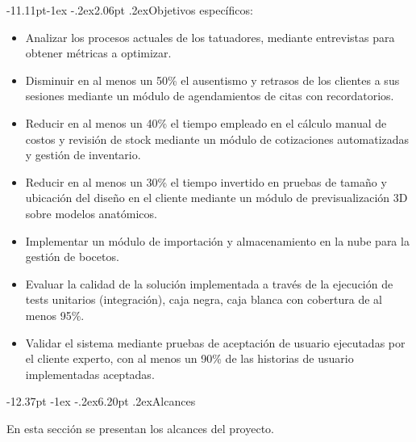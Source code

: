 \documentclass[12pt,letterpaper,oneside]{report}
\makeatletter
\renewcommand\section{\@startsection{section}{1}{\z@}%
  {-12.37pt \@plus -1ex \@minus -.2ex}{6.20pt \@plus.2ex}{\normalfont\large\bfseries}}
\renewcommand\subsection{\@startsection{subsection}{2}{\z@}%
  {-11.11pt\@plus -1ex \@minus -.2ex}{2.06pt \@plus .2ex}{\normalfont\normalsize\bfseries}}
\makeatother
\begin{document}
\subsection{Objetivos específicos:}

\begin{itemize}
  \item Analizar los procesos actuales de los tatuadores, mediante entrevistas para obtener métricas a optimizar.
  \item Disminuir en al menos un 50\% el ausentismo y retrasos de los clientes a sus sesiones mediante un módulo de agendamientos de citas con recordatorios.
  \item Reducir en al menos un 40\% el tiempo empleado en el cálculo manual de costos y revisión de stock mediante un módulo de cotizaciones automatizadas y gestión de inventario.
  \item Reducir en al menos un 30\% el tiempo invertido en pruebas de tamaño y ubicación del diseño en el cliente mediante un módulo de previsualización 3D sobre modelos anatómicos.
  \item Implementar un módulo de importación y almacenamiento en la nube para la gestión de bocetos.
  \item Evaluar la calidad de la solución implementada a través de la ejecución de tests unitarios (integración), caja negra, caja blanca con cobertura de al menos 95\%.
  \item Validar el sistema mediante pruebas de aceptación de usuario ejecutadas por el cliente experto, con al menos un 90\% de las historias de usuario implementadas aceptadas.
\end{itemize}

\section{Alcances}

En esta sección se presentan los alcances del proyecto.
\end{document}
